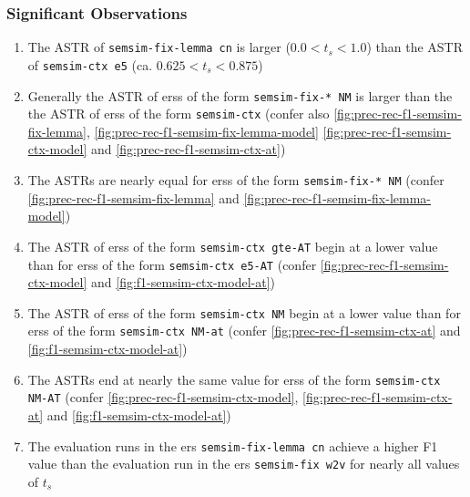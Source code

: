 \documentclass[11pt]{scrreprt}
\newcounter{listcounter}
\begin{document}
{\subsubsection{Significant Observations}
\begin{enumerate}[label=\arabic{listcounter}.\arabic*]
	\item The ASTR of \texttt{semsim-fix-lemma cn} is larger (\(0.0 < t_s < 1.0\)) than the ASTR of \texttt{semsim-ctx e5} (ca. \(0.625 < t_s < 0.875\)) \label{obs-itm:astr-lemma-fness-cn-higher-than-cness-e5}
	\item Generally the ASTR of \gls{ers}s of the form \texttt{semsim-fix-* NM} is larger than the the ASTR of \gls{ers}s of the form \texttt{semsim-ctx} (confer also \cref{fig:prec-rec-f1-semsim-fix-lemma}, \cref{fig:prec-rec-f1-semsim-fix-lemma-model} \cref{fig:prec-rec-f1-semsim-ctx-model} and \cref{fig:prec-rec-f1-semsim-ctx-at}) \label{obs-itm:astr-fness-higher-than-cness}
	\item The ASTRs are nearly equal for \gls{ers}s of the form \texttt{semsim-fix-* NM} \label{obs-itm:ASTR-equal-fness} (confer \cref{fig:prec-rec-f1-semsim-fix-lemma} and \cref{fig:prec-rec-f1-semsim-fix-lemma-model}) \label{obs-itm:astr-fness-equal}
	\item The ASTR of \gls{ers}s of the form \texttt{semsim-ctx gte-AT} begin at a lower value than for \gls{ers}s of the form \texttt{semsim-ctx e5-AT} (confer \cref{fig:prec-rec-f1-semsim-ctx-model} and \cref{fig:f1-semsim-ctx-model-at}) \label{obs-itm:astr-cness-gte-starts-earlier}
	\item The ASTR of \gls{ers}s of the form \texttt{semsim-ctx NM} begin at a lower value than for \gls{ers}s of the form \texttt{semsim-ctx NM-at} (confer \cref{fig:prec-rec-f1-semsim-ctx-at} and \cref{fig:f1-semsim-ctx-model-at}) \label{obs-itm:astr-cness-at-starts-earlier}
	\item The ASTRs end at nearly the same value for \gls{ers}s of the form \texttt{semsim-ctx NM-AT} \label{obs-itm:ASTR-equal-fness} (confer \cref{fig:prec-rec-f1-semsim-ctx-model}, \cref{fig:prec-rec-f1-semsim-ctx-at} and \cref{fig:f1-semsim-ctx-model-at}) \label{obs-itm:astr-cness-end-equal}

	\item The evaluation runs in the \gls{ers} \texttt{semsim-fix-lemma cn} achieve a higher F1 value than the evaluation run in the \gls{ers} \texttt{semsim-fix w2v} for nearly all values of \(t_s\) \label{obs-itm:lemma-fness-higher-f1-nearly-always}


\end{enumerate}}
\end{document}

